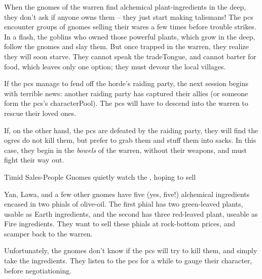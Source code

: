
 
% 
% 
% 
% 
% 


\label{gnomeWarrenPrelude}

\noindent
When the gnomes of the \gls{warren} find alchemical plant-\glspl{ingredient} in the \gls{deep}, they don't ask if anyone owns them -- they just start making \glspl{talisman}!
The \glspl{pc} encounter groups of gnomes selling their wares a few times before trouble strikes.
In a flash, the goblins who owned those powerful plants, which grow in the \gls{deep}, follow the gnomes and slay them.
But once trapped in the \gls{warren}, they realize they will soon starve.
They cannot speak the \gls{tradeTongue}, and cannot barter for food, which leaves only one option; they must devour the local \glspl{village}.

If the \glspl{pc} manage to fend off the horde's raiding party, the next session begins with terrible news: another raiding party has captured their allies (or someone form the \glspl{pc}'s \gls{characterPool}).
The \glspl{pc} will have to descend into the warren to rescue their loved ones.

If, on the other hand, the \glspl{pc} are defeated by the raiding party, they will find the \glspl{ogre} do not kill them, but prefer to grab them and stuff them into sacks.
In this case, they begin in the \textit{bowels} of the \gls{warren}, without their weapons, and must fight their way out.

{Timid Sales-People}%
{Gnomes quietly watch the , hoping to sell }%

\begin{exampletext}
		Yan, Lawa, and a few other gnomes have five (yes, five!) alchemical \glspl{ingredient} encased in two phials of olive-oil.
		The first phial has two green-leaved plants, usable as Earth \glspl{ingredient}, and the second has three red-leaved plant, useable as Fire \glspl{ingredient}.
		They want to sell these phials at rock-bottom prices, and scamper back to the \gls{warren}.

		Unfortunately, the gnomes don't know if the \glspl{pc} will try to kill them, and simply take the \glspl{ingredient}.
		They listen to the \glspl{pc} for a while to gauge their character, before negotiationing.

\end{exampletext}


